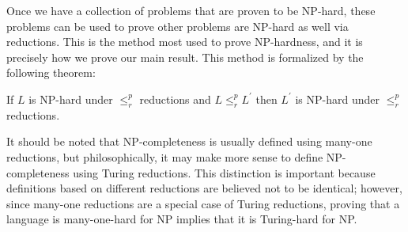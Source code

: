 Once we have a collection of problems that are proven to be NP-hard,
these problems can be used to prove other problems are NP-hard as well via
reductions.  This is the method most used to prove NP-hardness, and it is
precisely how we prove our main result.
This method is formalized by the following theorem:

\begin{theorem}
If $L$ is\/ {\rm NP}-hard under $\leq^p_r$ reductions and
$L \leq^p_r L^\prime$ then $L^\prime$ is\/ {\rm NP}-hard under
$\leq^p_r$ reductions.
\end{theorem}

It should be noted that NP-completeness is usually defined using many-one
reductions, but philosophically, it may make more sense to define
NP-completeness using Turing reductions.  This distinction is important
because definitions based on different reductions are believed not to be
identical; however, since many-one reductions are a special case of Turing
reductions, proving that a language is many-one-hard for NP implies that it
is Turing-hard for NP.


